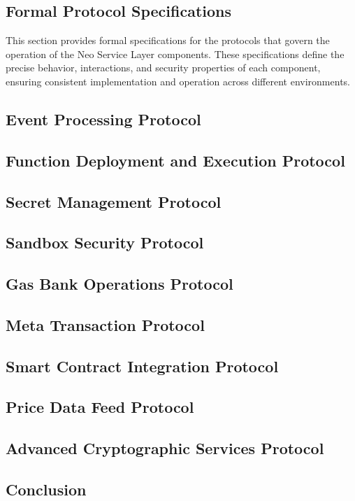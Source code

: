 \documentclass{article}
\begin{document}
\subsection{Formal Protocol Specifications}
\label{subsec:formal-protocols}

This section provides formal specifications for the protocols that govern the operation of the Neo Service Layer components. These specifications define the precise behavior, interactions, and security properties of each component, ensuring consistent implementation and operation across different environments.

\subsection{Event Processing Protocol}
\label{subsec:event-protocol}

\subsection{Function Deployment and Execution Protocol}
\label{subsec:function-protocol}

\subsection{Secret Management Protocol}
\label{subsec:secret-protocol}

\subsection{Sandbox Security Protocol}
\label{subsec:sandbox-protocol}

\subsection{Gas Bank Operations Protocol}
\label{subsec:gas-bank-protocol}

\subsection{Meta Transaction Protocol}
\label{subsec:meta-tx-protocol}

\subsection{Smart Contract Integration Protocol}
\label{subsec:smart-contract-protocol}

\subsection{Price Data Feed Protocol}
\label{subsec:price-feed-protocol}

\subsection{Advanced Cryptographic Services Protocol}
\label{subsec:advanced-crypto-protocol}

\subsection{Conclusion}
\label{subsec:nsl-conclusion}
\end{document}
